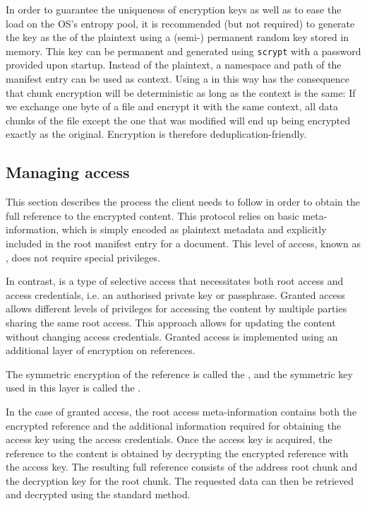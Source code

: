 In order to guarantee the uniqueness of encryption keys as well as to ease the load on the OS's entropy pool, it is recommended (but not required) to generate the key as the  of the plaintext using a (semi-) permanent random key stored in memory. 
This key can be permanent and generated using \lstinline{scrypt} \cite{percival2009stronger}
with a password provided upon startup. Instead of the plaintext, a namespace and path of the manifest entry can be used as context.
Using a  in this way has the consequence that chunk encryption will be deterministic as long as the context is the same: If we exchange one byte of a file and encrypt it with the same context, all data chunks of the file except the one that was modified will end up being encrypted exactly as the original. Encryption is therefore deduplication-friendly. 


\subsection{Managing access\statusgreen}\label{sec:managing-access}

This section describes the process the client needs to follow in order to obtain the full reference to the encrypted content. This protocol relies on basic meta-information, which is simply encoded as plaintext metadata and explicitly included in the root manifest entry for a document. This level of access, known as , does not require special privileges.

In contrast,  is a type of selective access that necessitates both root access and access credentials, i.e. an authorised private key or passphrase. Granted access allows different levels of privileges for accessing the content by multiple parties sharing the same root access. This approach allows for updating the content without changing access credentials. Granted access is implemented using an additional layer of encryption on references.

The symmetric encryption of the reference is called the , and the symmetric key used in this layer is called the .

In the case of granted access, the root access meta-information contains both the encrypted reference and the additional information required for obtaining the access key using the access credentials. Once the access key is acquired, the reference to the content is obtained by decrypting the encrypted reference with the access key. The resulting full reference consists of the address root chunk and the decryption key for the root chunk. The requested data can then be retrieved and decrypted using the standard method.


